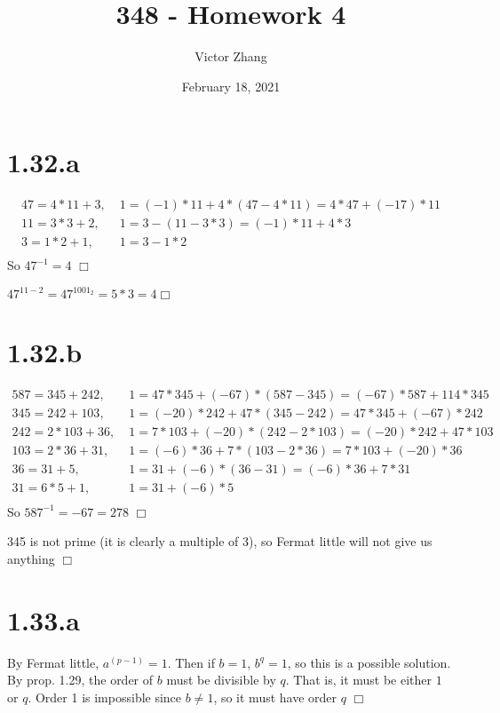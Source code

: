 \documentclass{article}
\title{348 - Homework 4}
\author{Victor Zhang}
\date{February 18, 2021}
\begin{document}
\maketitle


\section*{1.32.a}
\begin{equation*}
\begin{split}
47 = 4*11 + 3,\; & 1 = (-1)*11 + 4*(47 - 4*11) = 4*47 + (-17)*11\\
11 = 3*3 + 2,\; & 1 = 3 - (11- 3*3) = (-1)*11 +4*3\\
3 = 1*2 + 1,\; & 1 = 3 - 1*2\\
\end{split}
\end{equation*}
So $47^{-1} = 4$ $\Box$

$47^{11-2} = 47^{1001_2} = 5*3 = 4 \Box$

\section*{1.32.b}
\begin{equation*}
\begin{split}
587 = 345 + 242,\; & 1 = 47*345 + (-67)*(587 - 345) = (-67)*587 + 114*345\\
345 = 242 + 103,\; & 1 = (-20)*242 + 47*(345-242) = 47*345 + (-67)*242\\
242 = 2*103 + 36,\; & 1 = 7*103 + (-20)*(242-2*103) = (-20)*242 + 47*103\\
103 = 2*36 + 31,\; & 1 = (-6)*36 + 7*(103 - 2*36) = 7*103 + (-20)*36\\
36 = 31 + 5,\; & 1 = 31 + (-6)*(36 - 31) = (-6)*36 + 7*31\\
31 = 6*5 + 1,\; & 1 = 31 + (-6)*5\\
\end{split}
\end{equation*}
So $587^{-1} = -67 = 278$ $\Box$

345 is not prime (it is clearly a multiple of 3), so Fermat little will not give us anything $\Box$

\section*{1.33.a}
By Fermat little, $a^{(p-1)} = 1$. Then if $b = 1$, $b^q = 1$, so this is a possible solution. By prop. 1.29, the order of $b$ must be divisible by $q$. That is, it must be either $1$ or $q$. Order 1 is impossible since $b \neq 1$, so it must have order $q$ $\Box$
\end{document}
